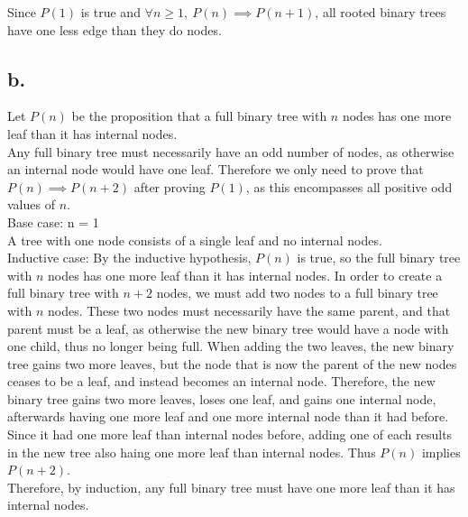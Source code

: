 \documentclass[11pt]{article}
\begin{document}
Since $P(1)$ is true and $\forall n \geq 1,\  P(n) \implies P(n+1)$, all rooted binary trees have one less edge than they do nodes.

\subsection*{b.}
Let $P(n)$ be the proposition that a full binary tree with $n$ nodes has one more leaf than it has internal nodes. \\ 
Any full binary tree must necessarily have an odd number of nodes, as otherwise an internal node would have one leaf. Therefore we only need to prove that $P(n) \implies P(n + 2)$ after proving $P(1)$, as this encompasses all positive odd values of $n$. \\ 
Base case: n = 1 \\ 
A tree with one node consists of a single leaf and no internal nodes.\\ 
Inductive case:
By the inductive hypothesis, $P(n)$ is true, so the full binary tree with $n$ nodes has one more leaf than it has internal nodes. In order to create a full binary tree with $n + 2$ nodes, we must add two nodes to a full binary tree with $n$ nodes. These two nodes must necessarily have the same parent, and that parent must be a leaf, as otherwise the new binary tree would have a node with one child, thus no longer being full. When adding the two leaves, the new binary tree gains two more leaves, but the node that is now the parent of the new nodes ceases to be a leaf, and instead becomes an internal node. Therefore, the new binary tree gains two more leaves, loses one leaf, and gains one internal node, afterwards having one more leaf and one more internal node than it had before. Since it had one more leaf than internal nodes before, adding one of each results in the new tree also  haing one more leaf than internal nodes. Thus $P(n)$ implies $P(n+2)$. \\ 

Therefore, by induction, any full binary tree must have one more leaf than it has internal nodes. \\
\end{document}
